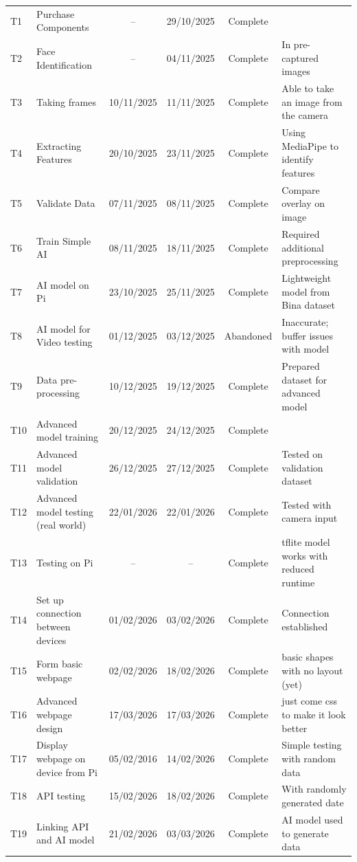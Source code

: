 \begin{landscape}
\begin{longtable}{@{}p{1.5cm} p{6.5cm} ccc p{9cm}@{}}
    T1  & Purchase Components & -- & 29/10/2025 & Complete &  \\
    T2  & Face Identification & -- & 04/11/2025 & Complete & In pre-captured images \\
    T3  & Taking frames & 10/11/2025 & 11/11/2025 & Complete & Able to take an image from the camera \\
    T4  & Extracting Features & 20/10/2025 & 23/11/2025 & Complete & Using MediaPipe to identify features \\
    T5  & Validate Data & 07/11/2025 & 08/11/2025 & Complete & Compare overlay on image \\
    T6  & Train Simple AI & 08/11/2025 & 18/11/2025 & Complete & Required additional preprocessing \\
    T7  & AI model on Pi & 23/10/2025 & 25/11/2025 & Complete & Lightweight model from Bina dataset \\
    T8  & AI model for Video testing & 01/12/2025 & 03/12/2025 & Abandoned & Inaccurate; buffer issues with model \\
    T9  & Data pre-processing & 10/12/2025 & 19/12/2025 & Complete & Prepared dataset for advanced model \\
    T10 & Advanced model training & 20/12/2025 & 24/12/2025 & Complete &  \\
    T11 & Advanced model validation & 26/12/2025 & 27/12/2025 & Complete & Tested on validation dataset \\
    T12 & Advanced model testing (real world) & 22/01/2026 & 22/01/2026 & Complete & Tested with camera input \\
    T13 & Testing on Pi & -- & -- & Complete & tflite model works with reduced runtime \\
    T14 & Set up connection between devices & 01/02/2026 & 03/02/2026 & Complete & Connection established \\
    T15 & Form basic webpage & 02/02/2026 & 18/02/2026 & Complete & basic shapes with no layout (yet) \\
    T16 & Advanced webpage design & 17/03/2026 & 17/03/2026 & Complete & just come css to make it look better \\
    T17 & Display webpage on device from Pi & 05/02/2016 & 14/02/2026 & Complete & Simple testing with random data \\
    T18 & API testing & 15/02/2026 & 18/02/2026 & Complete & With randomly generated date \\
    T19 & Linking API and AI model & 21/02/2026 & 03/03/2026 & Complete & AI model used to generate data \\

\end{longtable}
\end{landscape}

